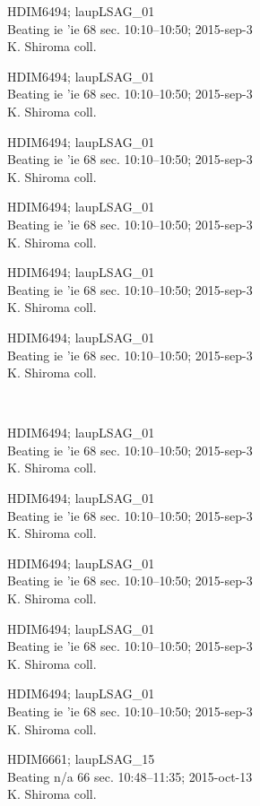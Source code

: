 \documentclass[2pt]{extarticle}
\begin{document}
\noindent
\parbox{0.16\textwidth}{\tiny \raggedright \rule[-0.3\baselineskip]{0pt}{10pt}HDIM6494; laupLSAG\_01\\ Beating ie 'ie 68 sec. 10:10--10:50; 2015-sep-3\\ K. Shiroma coll.}
\parbox{0.16\textwidth}{\tiny \raggedright \rule[-0.3\baselineskip]{0pt}{10pt}HDIM6494; laupLSAG\_01\\ Beating ie 'ie 68 sec. 10:10--10:50; 2015-sep-3\\ K. Shiroma coll.}
\parbox{0.16\textwidth}{\tiny \raggedright \rule[-0.3\baselineskip]{0pt}{10pt}HDIM6494; laupLSAG\_01\\ Beating ie 'ie 68 sec. 10:10--10:50; 2015-sep-3\\ K. Shiroma coll.}
\parbox{0.16\textwidth}{\tiny \raggedright \rule[-0.3\baselineskip]{0pt}{10pt}HDIM6494; laupLSAG\_01\\ Beating ie 'ie 68 sec. 10:10--10:50; 2015-sep-3\\ K. Shiroma coll.}
\parbox{0.16\textwidth}{\tiny \raggedright \rule[-0.3\baselineskip]{0pt}{10pt}HDIM6494; laupLSAG\_01\\ Beating ie 'ie 68 sec. 10:10--10:50; 2015-sep-3\\ K. Shiroma coll.}
\parbox{0.16\textwidth}{\tiny \raggedright \rule[-0.3\baselineskip]{0pt}{10pt}HDIM6494; laupLSAG\_01\\ Beating ie 'ie 68 sec. 10:10--10:50; 2015-sep-3\\ K. Shiroma coll.} \\ 
\vspace{0.001in} 

\noindent
\parbox{0.16\textwidth}{\tiny \raggedright \rule[-0.3\baselineskip]{0pt}{10pt}HDIM6494; laupLSAG\_01\\ Beating ie 'ie 68 sec. 10:10--10:50; 2015-sep-3\\ K. Shiroma coll.}
\parbox{0.16\textwidth}{\tiny \raggedright \rule[-0.3\baselineskip]{0pt}{10pt}HDIM6494; laupLSAG\_01\\ Beating ie 'ie 68 sec. 10:10--10:50; 2015-sep-3\\ K. Shiroma coll.}
\parbox{0.16\textwidth}{\tiny \raggedright \rule[-0.3\baselineskip]{0pt}{10pt}HDIM6494; laupLSAG\_01\\ Beating ie 'ie 68 sec. 10:10--10:50; 2015-sep-3\\ K. Shiroma coll.}
\parbox{0.16\textwidth}{\tiny \raggedright \rule[-0.3\baselineskip]{0pt}{10pt}HDIM6494; laupLSAG\_01\\ Beating ie 'ie 68 sec. 10:10--10:50; 2015-sep-3\\ K. Shiroma coll.}
\parbox{0.16\textwidth}{\tiny \raggedright \rule[-0.3\baselineskip]{0pt}{10pt}HDIM6494; laupLSAG\_01\\ Beating ie 'ie 68 sec. 10:10--10:50; 2015-sep-3\\ K. Shiroma coll.}
\parbox{0.16\textwidth}{\tiny \raggedright \rule[-0.3\baselineskip]{0pt}{10pt}HDIM6661; laupLSAG\_15\\ Beating n/a 66 sec. 10:48--11:35; 2015-oct-13\\ K. Shiroma coll.} \\ 
\vspace{0.001in} 
\end{document}
